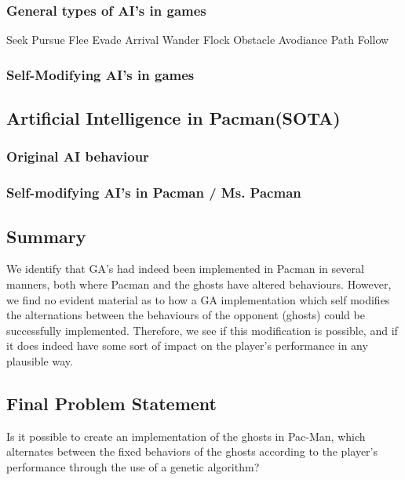 \subsubsection{General types of AI's in games}

Seek
Pursue
Flee
Evade
Arrival
Wander
Flock
Obstacle Avodiance
Path Follow






\subsubsection{Self-Modifying AI's in games}


\subsection{Artificial Intelligence in Pacman(SOTA)}

\subsubsection{Original AI behaviour}


\subsubsection{Self-modifying AI's in Pacman / Ms. Pacman}

\subsection{Summary}
We identify that GA’s had indeed been implemented in Pacman in several manners, both where Pacman and the ghosts have altered behaviours. However, we find no evident material as to how a GA implementation which self modifies the alternations between the behaviours of the opponent (ghosts) could be successfully implemented. Therefore, we see if this modification is possible, and if it does indeed have some sort of impact on the player’s performance in any plausible way.


\subsection{Final Problem Statement} \label{sec:finalproblemstatement}
Is it possible to create an implementation of the ghosts in Pac-Man, which alternates between the fixed behaviors of the ghosts according to the player's performance through the use of a genetic algorithm?